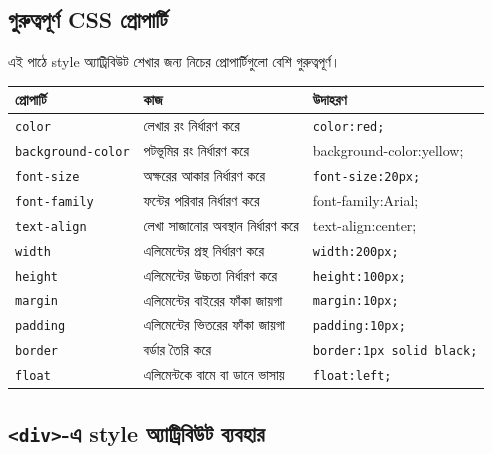 \subsection{গুরুত্বপূর্ণ CSS প্রোপার্টি}

এই পাঠে style অ্যাট্রিবিউট শেখার জন্য নিচের প্রোপার্টিগুলো বেশি গুরুত্বপূর্ণ।

\begin{center}
\footnotesize
\begin{tabular}{|p{}|p{}|p{}|}
\hline
\textbf{প্রোপার্টি} & \textbf{কাজ} & \textbf{উদাহরণ} \\
\hline
\texttt{color} & লেখার রং নির্ধারণ করে & \texttt{color:red;} \\
\hline
\texttt{background-color} & পটভূমির রং নির্ধারণ করে & {\scriptsize\ttfamily background-color:yellow;} \\
\hline
\texttt{font-size} & অক্ষরের আকার নির্ধারণ করে & \texttt{font-size:20px;} \\
\hline
\texttt{font-family} & ফন্টের পরিবার নির্ধারণ করে & {\scriptsize\ttfamily font-family:Arial;} \\
\hline
\texttt{text-align} & লেখা সাজানোর অবস্থান নির্ধারণ করে & {\scriptsize\ttfamily text-align:center;} \\
\hline
\texttt{width} & এলিমেন্টের প্রস্থ নির্ধারণ করে & \texttt{width:200px;} \\
\hline
\texttt{height} & এলিমেন্টের উচ্চতা নির্ধারণ করে & \texttt{height:100px;} \\
\hline
\texttt{margin} & এলিমেন্টের বাইরের ফাঁকা জায়গা & \texttt{margin:10px;} \\
\hline
\texttt{padding} & এলিমেন্টের ভিতরের ফাঁকা জায়গা & \texttt{padding:10px;} \\
\hline
\texttt{border} & বর্ডার তৈরি করে & \texttt{border:1px solid black;} \\
\hline
\texttt{float} & এলিমেন্টকে বামে বা ডানে ভাসায় & \texttt{float:left;} \\
\hline
\end{tabular}
\end{center}

\subsection{\texttt{<div>}-এ style অ্যাট্রিবিউট ব্যবহার}

